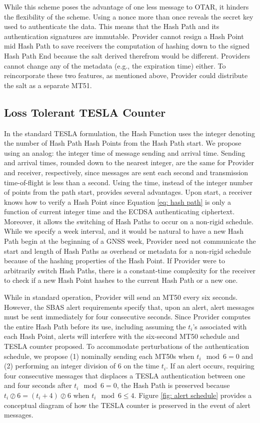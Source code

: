 \documentclass[letterpaper,times]{IONconf/IONconf}
\begin{document}
While this scheme poses the advantage of one less message to OTAR, it hinders the flexibility of the scheme.
Using a nonce more than once reveals the secret key used to authenticate the data.
This means that the Hash Path and its authentication signatures are immutable.
Provider cannot resign a Hash Point mid Hash Path to save receivers the computation of hashing down to the signed Hash Path End because the salt derived therefrom would be different.
Providers cannot change any of the metadata (e.g., the expiration time) either.
To reincorporate these two features, as mentioned above, Provider could distribute the salt as a separate MT51.

\subsection{Loss Tolerant TESLA Counter} \label{sec: alert salt}

In the standard TESLA formulation, the Hash Function uses the integer denoting the number of Hash Path Hash Points from the Hash Path start.
We propose using an analog: the integer time of message sending and arrival time.
Sending and arrival times, rounded down to the nearest integer, are the same for Provider and receiver, respectively, since messages are sent each second and transmission time-of-flight is less than a second.
Using the time, instead of the integer number of points from the path start, provides several advantages.
Upon start, a receiver knows how to verify a Hash Point since Equation \eqref{eq: hash path} is only a function of current integer time and the ECDSA authenticating ciphertext.
Moreover, it allows the switching of Hash Paths to occur on a non-rigid schedule.
While we specify a week interval, and it would be natural to have a new Hash Path begin at the beginning of a GNSS week, Provider need not communicate the start and length of Hash Paths as overhead or metadata for a non-rigid schedule because of the hashing properties of the Hash Point.
If Provider were to arbitrarily switch Hash Paths, there is a constant-time complexity for the receiver to check if a new Hash Point hashes to the current Hash Path or a new one.

While in standard operation, Provider will send an MT50 every six seconds.
However, the SBAS alert requirements specify that, upon an alert, alert messages must be sent immediately for four consecutive seconds.
Since Provider computes the entire Hash Path before its use, including assuming the $t_i$'s associated with each Hash Point, alerts will interfere with the six-second MT50 schedule and TESLA counter proposed.
To accommodate perturbations of the authentication schedule, we propose (1) nominally sending each MT50s when $t_i \mod 6 = 0$ and (2) performing an integer division of 6 on the time $t_i$.
If an alert occurs, requiring four consecutive messages that displaces a TESLA authentication between one and four seconds after $t_i \mod 6 = 0$, the Hash Path is preserved because $t_i \oslash 6 = (t_i + 4) \oslash 6$ when $t_i \mod 6 \leq 4 $.
Figure \ref{fig: alert schedule} provides a conceptual diagram of how the TESLA counter is preserved in the event of alert messages.
\end{document}
